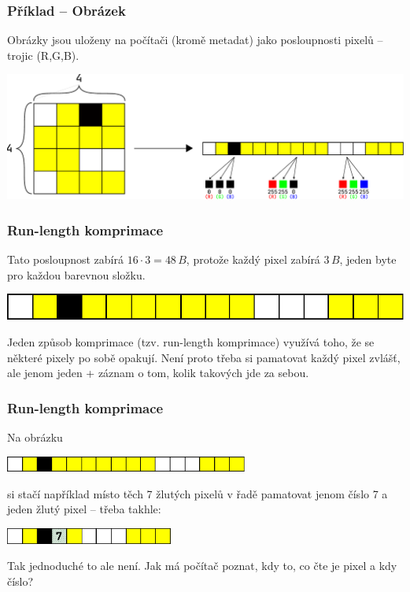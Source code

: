 \documentclass[aspectratio=169,11pt,svgnames]{beamer}
\begin{document}
\begin{frame}
 \frametitle{Příklad -- Obrázek}
 Obrázky jsou uloženy na počítači (kromě metadat) jako posloupnosti pixelů --
 trojic (R,G,B).
 \begin{center}
  \includegraphics[width=\textwidth]{image-3.pdf}
 \end{center}
\end{frame}

\begin{frame}
 \frametitle{Run-length komprimace}
 Tato posloupnost zabírá $16 \cdot 3 = 48\,B$, protože každý pixel zabírá
 $3\,B$, jeden byte pro každou barevnou složku.
 \begin{center}
  \includegraphics[width=.5\textwidth]{image-4.pdf}
 \end{center}
 \pause
 Jeden způsob komprimace (tzv. \alert{run-length} komprimace) využívá toho, že
 se některé pixely po sobě opakují.
 \pause
 Není proto třeba si pamatovat každý pixel zvlášť, ale jenom jeden + záznam o
 tom, kolik takových jde za sebou.
\end{frame}

\begin{frame}
 \frametitle{Run-length komprimace}
 Na obrázku
 \begin{center}
  \includegraphics[width=8cm]{image-4.pdf}
 \end{center}
 si stačí například místo těch 7 žlutých pixelů v řadě pamatovat jenom číslo 7 a
 jeden žlutý pixel -- třeba takhle:
 \begin{center}
  \includegraphics[width=5.5cm]{image-5.pdf}
 \end{center}
 \pause
 Tak jednoduché to ale není. Jak má počítač poznat, kdy to, co čte je pixel a
 kdy číslo?
\end{frame}
\end{document}
